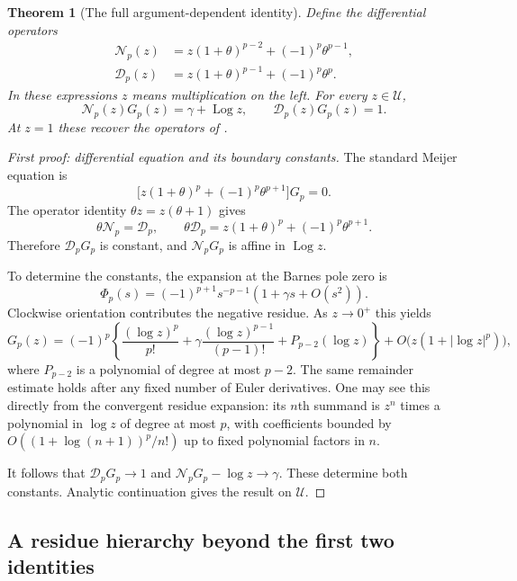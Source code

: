 \documentclass[11pt,a4paper]{article}
\numberwithin{equation}{section}
\newtheorem{theorem}{Theorem}[section]
\theoremstyle{definition}
\theoremstyle{remark}
\DeclareMathOperator{\Log}{Log}
\begin{document}
\begin{theorem}[The full argument-dependent identity]
\label{cmf:log-identity}
Define the differential operators
\begin{align*}
 \mathcal N_p(z)&=z(1+\theta)^{p-2}+(-1)^p\theta^{p-1},\\
 \mathcal D_p(z)&=z(1+\theta)^{p-1}+(-1)^p\theta^p.
\end{align*}
In these expressions $z$ means multiplication on the left.
For every $z\in\mathscr U$,
\begin{equation}\label{cmf:main-identity}
 \mathcal N_p(z)G_p(z)=\gamma+\Log z,
 \qquad \mathcal D_p(z)G_p(z)=1.
\end{equation}
At $z=1$ these recover the operators of
\cite[Proposition 1]{CMF2026}.
\end{theorem}

\begin{proof}[First proof: differential equation and its boundary constants]
The standard Meijer equation \cite[Section 16.21]{NISTDLMF} is
\[
 \bigl[z(1+\theta)^p+(-1)^p\theta^{p+1}\bigr]G_p=0.
\]
The operator identity $\theta z=z(\theta+1)$ gives
\[
 \theta\mathcal N_p=\mathcal D_p,
 \qquad
 \theta\mathcal D_p=z(1+\theta)^p+(-1)^p\theta^{p+1}.
\]
Therefore $\mathcal D_pG_p$ is constant, and
$\mathcal N_pG_p$ is affine in $\Log z$.

To determine the constants, the expansion at the Barnes pole zero is
\[
 \Phi_p(s)=(-1)^{p+1}s^{-p-1}(1+\gamma s+O(s^2)).
\]
Clockwise orientation contributes the negative residue. As
$z\to0^+$ this yields
\[
 G_p(z)=(-1)^p\left\{
   \frac{(\log z)^p}{p!}
   +\gamma\frac{(\log z)^{p-1}}{(p-1)!}
   +P_{p-2}(\log z)\right\}
   +O\bigl(z(1+|\log z|^p)\bigr),
\]
where $P_{p-2}$ is a polynomial of degree at most $p-2$.
The same remainder estimate holds after any fixed number of
Euler derivatives. One may see this directly from the convergent
residue expansion: its $n$th summand is $z^n$ times a polynomial
in $\log z$ of degree at most $p$, with coefficients bounded by
$O((1+\log(n+1))^p/n!)$ up to fixed polynomial factors in $n$.

It follows that $\mathcal D_pG_p\to1$ and
$\mathcal N_pG_p-\log z\to\gamma$. These determine both
constants. Analytic continuation gives the result on $\mathscr U$.
\end{proof}

\subsection{A residue hierarchy beyond the first two identities}
\end{document}
